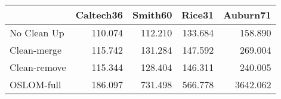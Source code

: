 \begin{tabular}{lrrrr}
\toprule
{} & Caltech36 & Smith60 &  Rice31 & Auburn71 \\
\midrule
No Clean Up  &   110.074 & 112.210 & 133.684 &  158.890 \\
Clean-merge  &   115.742 & 131.284 & 147.592 &  269.004 \\
Clean-remove &   115.344 & 128.404 & 146.311 &  240.005 \\
OSLOM-full   &   186.097 & 731.498 & 566.778 & 3642.062 \\
\bottomrule
\end{tabular}
